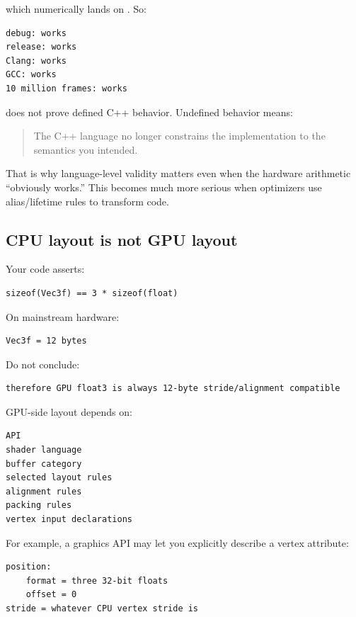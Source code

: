 which numerically lands on . So:

\begin{verbatim}
debug: works
release: works
Clang: works
GCC: works
10 million frames: works
\end{verbatim}

does not prove defined C++ behavior. Undefined behavior means:

\begin{quote}
The C++ language no longer constrains the implementation to the semantics you intended.
\end{quote}

That is why language-level validity matters even when the hardware arithmetic ``obviously works.'' This becomes much more serious when optimizers use alias/lifetime rules to transform code.

\subsection{CPU layout is not GPU layout}\label{05-engine-i-ch003-cpu-layout-is-not-gpu-layout}

\hypertarget{05-engine-i-ch003-cpu-layout-is-not-gpu-layout}{}

Your code asserts:

\begin{verbatim}
sizeof(Vec3f) == 3 * sizeof(float)
\end{verbatim}

On mainstream hardware:

\begin{verbatim}
Vec3f = 12 bytes
\end{verbatim}

Do not conclude:

\begin{verbatim}
therefore GPU float3 is always 12-byte stride/alignment compatible
\end{verbatim}

GPU-side layout depends on:

\begin{verbatim}
API
shader language
buffer category
selected layout rules
alignment rules
packing rules
vertex input declarations
\end{verbatim}

For example, a graphics API may let you explicitly describe a vertex attribute:

\begin{verbatim}
position:
    format = three 32-bit floats
    offset = 0
stride = whatever CPU vertex stride is
\end{verbatim}

